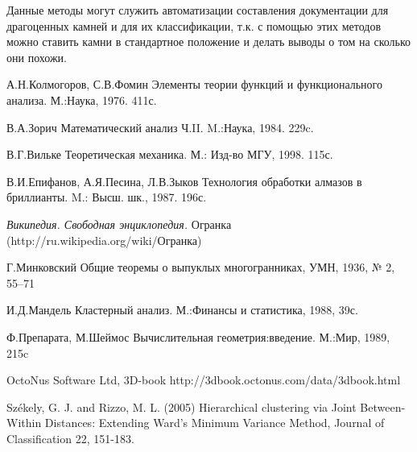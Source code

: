 \documentclass[a4paper,12pt, titlepage]{article}
\begin{document}
Данные методы могут служить  автоматизации составления документации для драгоценных камней и 
для их классификации, т.к. с помощью этих методов можно ставить камни в стандартное положение 
и делать выводы о том  на сколько они похожи.

\newpage
\begin{thebibliography}{99}                    %

А.Н.Колмогоров, С.В.Фомин Элементы теории функций и функционального анализа. М.:Наука, 1976. 411с.

В.А.Зорич  Математический анализ Ч.II. M.:Наука, 1984. 229c.

В.Г.Вильке Теоретическая механика. М.: Изд-во МГУ, 1998. 115с.

В.И.Епифанов, А.Я.Песина, Л.В.Зыков Технология обработки алмазов в бриллианты. M.: Высш. шк., 1987. 196с.

\textit{Википедия. Свободная энциклопедия.} Огранка\\
(http://ru.wikipedia.org/wiki/Огранка)


Г.Минковский Общие теоремы о выпуклых многогранниках, УМН, 1936, № 2, 55–71


И.Д.Мандель Кластерный анализ. М.:Финансы и статистика, 1988, 39с. 

Ф.Препарата, М.Шеймос  Вычислительная геометрия:введение. М.:Мир, 1989, 215c


OctoNus Software Ltd, 3D-book
http://3dbook.octonus.com/data/3dbook.html


Székely, G. J. and Rizzo, M. L. (2005) Hierarchical clustering via Joint Between-Within Distances: Extending Ward's Minimum Variance Method, Journal of Classification 22, 151-183.


\end{thebibliography}
\end{document}
